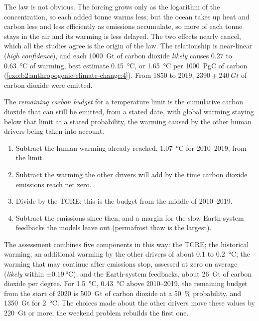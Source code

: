The law is not obvious. The forcing grows only as the logarithm of the concentration, so each
added tonne warms less; but the ocean takes up heat and carbon less and less efficiently as
emissions accumulate, so more of each tonne stays in the air and its warming is less delayed. The
two effects nearly cancel, which all the studies agree is the origin of the law. The relationship is
near-linear (\emph{high confidence}), and each \qty{1000}{Gt} of carbon dioxide \emph{likely} causes
0.27 to \qty{0.63}{\celsius} of warming, best estimate \qty{0.45}{\celsius}, or \qty{1.65}{\celsius}
per \qty{1000}{PgC} of carbon (\cref{exo:b2:anthropogenic-climate-change:4}). From 1850 to 2019,
$\num{2390} \pm \qty{240}{Gt}$ of carbon dioxide were emitted.

\begin{definition}\label{def:b2:anthropogenic-climate-change:budget}
The \emph{remaining carbon budget} for a temperature limit is the
cumulative carbon dioxide that can still be emitted, from a stated date, with global warming staying
below that limit at a stated probability, the warming caused by the other human drivers being taken
into account.
\end{definition}

\begin{method}\label{met:b2:anthropogenic-climate-change:budget}
\begin{enumerate}
  \item Subtract the human warming already reached, \qty{1.07}{\celsius} for 2010--2019, from the
        limit.
  \item Subtract the warming the other drivers will add by the time carbon dioxide emissions
        reach net zero.
  \item Divide by the TCRE: this is the budget from the middle of 2010--2019.
  \item Subtract the emissions since then, and a margin for the slow Earth-system feedbacks the
        models leave out (permafrost thaw is the largest).
\end{enumerate}
\end{method}

The assessment combines five components in this way: the TCRE; the historical warming; an
additional warming by the other drivers of about 0.1 to \qty{0.2}{\celsius}; the warming that may
continue after emissions stop, assessed at zero on average (\emph{likely} within $\pm
\qty{0.19}{\celsius}$); and the Earth-system feedbacks, about \qty{26}{Gt} of carbon dioxide per
degree. For \qty{1.5}{\celsius}, \qty{0.43}{\celsius} above 2010--2019, the remaining budget from the
start of 2020 is \qty{500}{Gt} of carbon dioxide at a \qty{50}{\percent} probability, and
\qty{1350}{Gt} for \qty{2}{\celsius}. The choices made about the other drivers move these values by
\qty{220}{Gt} or more; the weekend problem rebuilds the first one.

